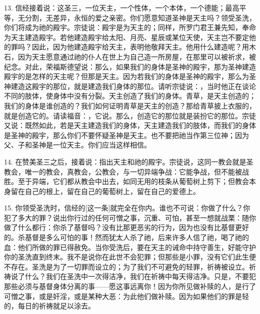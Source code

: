 13. 信经接着说：这圣三，一位天主，一个性体，一个本体，一个德能；最高平等，无分割，无差异，永恒的爱之亲密。你们愿意知道圣神是天主吗？领受圣洗，你们将成为祂的殿宇。宗徒说：殿宇是为天主的；同样，所罗门君王兼先知，奉命为天主建造殿宇。若他建造殿宇给太阳、月亮、星辰或某位天使，天主岂不要定他的罪吗？因此，因为他建造殿宇给天主，表明他敬拜天主。他用什么建造呢？用木石，因为天主愿意通过祂的仆人在世上为自己造一所房屋，在那里可以被祈求，被纪念。对此，荣福斯德望说：那么，如果我们的身体是圣神的殿宇，那为圣神建造殿宇的是怎样的天主呢？但那是天主。因为若我们的身体是圣神的殿宇，那么为圣神建造这殿宇的那位，就是建造我们身体的那位。请听宗徒说：，当时他正在谈论不同的肢体，使身体中没有分裂。天主创造了我们的身体。青草，是天主创造的；我们的身体是谁创造的？我们如何证明青草是天主的创造？那给青草披上衣服的，就是创造它的。请读福音：，它说。那么，创造它的那位就是装扮它的那位。宗徒又说：既然如此，若是天主建造我们的身体，天主建造我们的肢体，而我们的身体是圣神的殿宇，那么你们不要怀疑圣神是天主。也不要把祂当作第三位神；因为父、子和圣神是一位天主。你们应当这样相信。\par

14. 在赞美圣三之后，接着说：指出天主和祂的殿宇。宗徒说，这同一教会就是圣教会，唯一的教会，真教会，公教会，与一切异端争战：它能争战，但不能被战胜。至于异端，它们都从教会中出去，如同无用的枝条从葡萄树上剪下；但教会本身留在自己的根上，留在自己的葡萄树上，留在自己的爱德上。\par

15. 你领受圣洗时，信经的[这一条]就完全在你内。谁也不可说：你做了什么？你犯了多大的罪？说出你行过的任何可憎之事，沉重、可怕，甚至一想就战栗：随你做了什么都行：你杀了基督吗？没有比那更恶劣的行为，因为也没有比基督更好的。杀基督是多么可怕的事！然而犹太人杀了祂，后来许多人信了祂，喝了祂的血：他们所做的罪已得赦免。当你受洗后，要在天主的诫命中持守善生，好能守护你的圣洗直到终末。我不是说你在此世不会犯罪；但那些是小罪，没有它们此生便不存在。圣洗是为了一切罪而设立的；为了我们不可避免的轻罪，祈祷被设立。祈祷说了什么？我们在圣洗中一次得洁净，我们在祈祷中每天得洁净。只是，不要犯那些必须与基督身体分离的事——愿这事远离你！因为你所见做补赎的人，是行了可憎之事，或是奸淫，或是某种大恶：为此他们做补赎。因为如果他们的罪是轻的，每日的祈祷就足以涂去。\par

